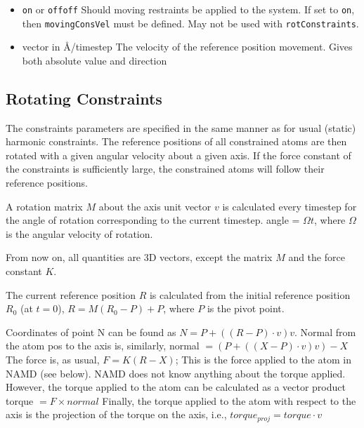 \begin{itemize}

\item
{}
{{\tt on} or {\tt off}}{{\tt off}}
{Should moving restraints be applied to the system. If set
to {\tt on}, then  {\tt movingConsVel} must be defined.
May not be used with {\tt rotConstraints}.}

\item
{}
{vector in \AA/timestep}
{The velocity of the reference position movement. Gives both absolute
value and direction}

\end{itemize}

\subsection{Rotating Constraints}

The constraints parameters are specified in the same manner as for
usual (static) harmonic constraints. The reference positions of all
constrained atoms are then rotated with a given angular velocity
about a given axis. If the force constant of the constraints is
sufficiently
large, the constrained atoms will follow their reference positions.

A rotation matrix $M$ about the axis unit vector $v$ is calculated every
timestep
for the angle of rotation corresponding to the current timestep.
    angle = $\Omega t$,
where $\Omega$ is the angular velocity of rotation.

From now on, all quantities are 3D vectors, except the matrix $M$ and the
force constant $K$.

The current reference position $R$ is calculated from the initial
reference
position $R_0$ (at $t=0$),
    $R = M (R_0 - P) + P$,
where $P$ is the pivot point.

%
%
%

Coordinates of point N can be found as
   $N = P + ( (R - P) \cdot v ) v$.
Normal from the atom pos to the axis is, similarly,
   normal $= ( P + ( (X - P) \cdot v ) v ) - X$
The force is, as usual,
   $F = K (R - X)$;
This is the force applied to the atom in NAMD (see below).
NAMD does not know anything about the torque
applied. However, the torque applied to the atom can be calculated
as a vector product
   torque $= F \times normal$
Finally, the torque applied to the atom with respect to the axis
is the projection of the torque on the axis, i.e.,
   $torque_{proj} = torque \cdot v$

